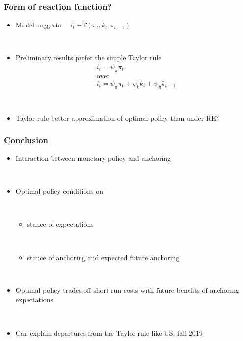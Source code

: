 \documentclass{beamer}
\begin{document}
\begin{frame}
	\frametitle{Form of reaction function?}
	
\begin{itemize}
\item Model suggests $\quad i_t = \mathbf{f}(\pi_t, k_{t}, \bar{\pi}_{t-1})$

\

\item Preliminary results prefer the simple Taylor rule 
\begin{align*}
&i_t = \psi_{\pi}\pi_t \\
& \text{over} \\
& i_t = \psi_{\pi}\pi_t + \psi_k k_t + \psi_{\bar{\pi}}\bar{\pi}_{t-1}
\end{align*}

\

\item Taylor rule better approximation of optimal policy than under RE?
\end{itemize}
	

\end{frame}

\begin{frame}
	\frametitle{Conclusion}
	
\begin{itemize}
\item Interaction between monetary policy and anchoring 

\

\item Optimal policy conditions on

\

\begin{itemize}

\item stance of expectations 

\

\item stance of anchoring and expected future anchoring
\end{itemize}

\

\item Optimal policy trades off short-run costs with future benefits of anchoring expectations

\

\item Can explain departures from the Taylor rule like US, fall 2019
\end{itemize}


\end{frame}
\end{document}
